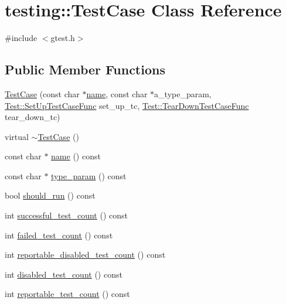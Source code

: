 \hypertarget{classtesting_1_1_test_case}{}\section{testing\+:\+:Test\+Case Class Reference}
\label{classtesting_1_1_test_case}


{\ttfamily \#include $<$gtest.\+h$>$}

\subsection*{Public Member Functions}
\begin{DoxyCompactItemize}
\item 
\hyperlink{classtesting_1_1_test_case_a8a43b04703bfc7d56597fcb9b76ffbf5}{Test\+Case} (const char $\ast$\hyperlink{classtesting_1_1_test_case_a3f1beb98d5f7e3b037a4ec82b64cc1cf}{name}, const char $\ast$a\+\_\+type\+\_\+param, \hyperlink{classtesting_1_1_test_a5f2a051d1d99c9b784c666c586186cf9}{Test\+::\+Set\+Up\+Test\+Case\+Func} set\+\_\+up\+\_\+tc, \hyperlink{classtesting_1_1_test_aa0f532e93b9f3500144c53f31466976c}{Test\+::\+Tear\+Down\+Test\+Case\+Func} tear\+\_\+down\+\_\+tc)
\item 
virtual \hyperlink{classtesting_1_1_test_case_a96ab68dd1f8f64a7087ac34ff64a2e46}{$\sim$\+Test\+Case} ()
\item 
const char $\ast$ \hyperlink{classtesting_1_1_test_case_a3f1beb98d5f7e3b037a4ec82b64cc1cf}{name} () const
\item 
const char $\ast$ \hyperlink{classtesting_1_1_test_case_a9df62c4104a4f856b477c9e8335bb689}{type\+\_\+param} () const
\item 
bool \hyperlink{classtesting_1_1_test_case_a843d6cd43f3e587bfa8681990b9d59df}{should\+\_\+run} () const
\item 
int \hyperlink{classtesting_1_1_test_case_ab61929942a202f03903182866bd0e086}{successful\+\_\+test\+\_\+count} () const
\item 
int \hyperlink{classtesting_1_1_test_case_a70e26eb070c75ae62a191fa610ea234f}{failed\+\_\+test\+\_\+count} () const
\item 
int \hyperlink{classtesting_1_1_test_case_ad6b34335955967bc361b2fbacd2dd6c9}{reportable\+\_\+disabled\+\_\+test\+\_\+count} () const
\item 
int \hyperlink{classtesting_1_1_test_case_a8ef690ab8ec74d02c99416637de71ae8}{disabled\+\_\+test\+\_\+count} () const
\item 
int \hyperlink{classtesting_1_1_test_case_ae4e69f1a77b6aba274981e987e50acab}{reportable\+\_\+test\+\_\+count} () const

\end{DoxyCompactItemize}
